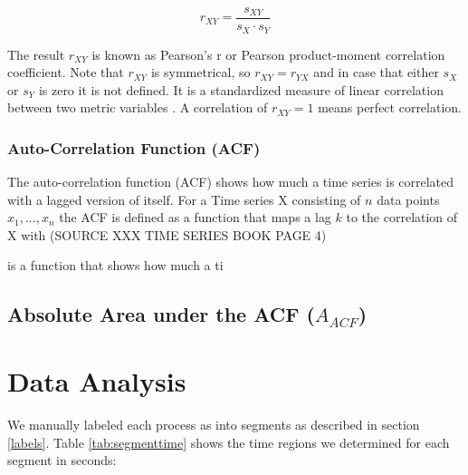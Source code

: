 \documentclass[12 pt]{scrartcl}
\begin{document}
\[ r_{XY} =  \frac{s_{XY}}{s_X \cdot s_Y} \]

The result $r_{XY}$ is known as Pearson's r or Pearson product-moment correlation coefficient. Note that $r_{XY}$ is symmetrical, so $r_{XY} = r_{YX}$ and in case that either $s_X$ or $s_Y$ is zero it is not defined. It is a standardized measure of linear correlation between two metric variables \citep[p.~538]{eid2017statistik}. A correlation of $r_{XY} = 1$ means perfect correlation.


\subsubsection{Auto-Correlation Function (ACF)}

The auto-correlation function (ACF) shows how much a time series is correlated with a lagged version of itself. For a Time series X consisting of $n$ data points $x_1, ..., x_n$ the ACF is defined as a function that maps a lag $k$ to the correlation of X with   (SOURCE XXX TIME SERIES BOOK PAGE 4)

is a function that shows how much a ti



\subsection{Absolute Area under the ACF ($A_{ACF}$)}

\section{Data Analysis}

We manually labeled each process as into segments as described in section \ref{labels}. Table \ref{tab:segmenttime} shows the time regions we determined for each segment in seconds:
\end{document}
